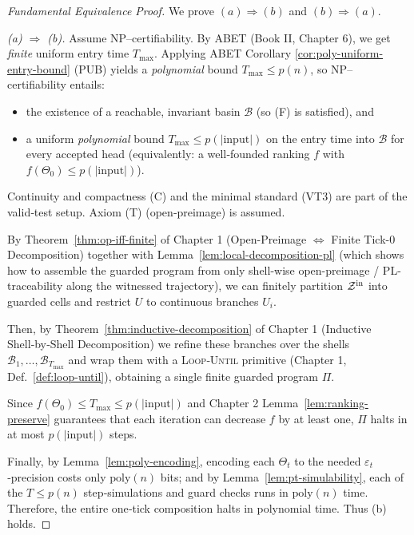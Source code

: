 \documentclass[12pt]{article}
\theoremstyle{definition}
\theoremstyle{plain}
\begin{document}
\begin{proof}[Fundamental Equivalence Proof]
We prove $(a)\Rightarrow(b)$ and $(b)\Rightarrow(a)$.

\medskip\noindent
\emph{(a) $\Rightarrow$ (b).}  
Assume NP–certifiability. By ABET (Book II, Chapter 6), we get \emph{finite} uniform entry time $T_{\max}$. Applying ABET Corollary \ref{cor:poly-uniform-entry-bound} (PUB) yields a \emph{polynomial} bound $T_{\max}\le p(n)$, so NP–certifiability entails:
\begin{itemize}
  \item the existence of a reachable, invariant basin $\mathcal B$ (so (F) is satisfied), and
  \item a uniform \emph{polynomial} bound $T_{\max}\le p(|\mathrm{input}|)$ on the entry time into $\mathcal B$ for every accepted head (equivalently: a well‑founded ranking $f$ with $f(\Theta_0)\le p(|\mathrm{input}|)$).
\end{itemize}
Continuity and compactness (C) and the minimal standard (VT3) are part of the valid‑test setup. Axiom (T) (open‑preimage) is assumed.  

By Theorem~\ref{thm:op-iff-finite} of Chapter 1 (Open-Preimage $\Leftrightarrow$ Finite Tick-0 Decomposition) together with Lemma~\ref{lem:local-decomposition-pl} (which shows how to assemble the guarded program from only shell-wise open-preimage / PL-traceability along the witnessed trajectory), we can finitely partition $\mathcal Z^{\rm in}$ into guarded cells and restrict $U$ to continuous branches $U_i$.

Then, by Theorem~\ref{thm:inductive-decomposition} of Chapter 1 (Inductive Shell‑by‑Shell Decomposition) we refine these branches over the shells $\mathcal B_1,\dots,\mathcal B_{T_{\max}}$ and wrap them with a \textsc{Loop‑Until} primitive (Chapter 1, Def.~\ref{def:loop-until}), obtaining a single finite guarded program $\Pi$.

Since $f(\Theta_0)\le T_{\max}\le p(|\mathrm{input}|)$ and Chapter 2 Lemma~\ref{lem:ranking-preserve} guarantees that each iteration can decrease $f$ by at least one, $\Pi$ halts in at most $p(|\mathrm{input}|)$ steps.  

Finally, by Lemma~\ref{lem:poly-encoding}, encoding each $\Theta_t$ to the needed $\varepsilon_t$‐precision costs only $\mathrm{poly}(n)$ bits; and by Lemma~\ref{lem:pt-simulability}, each of the $T\le p(n)$ step‐simulations and guard checks runs in $\mathrm{poly}(n)$ time.  Therefore, the entire one‐tick composition halts in polynomial time. Thus (b) holds.


\end{proof}
\end{document}
